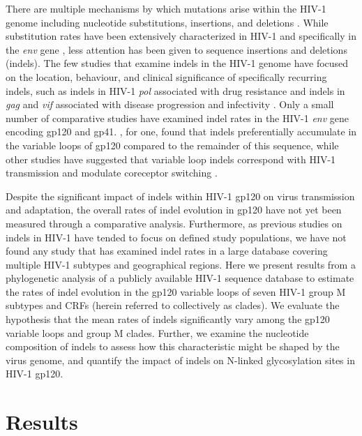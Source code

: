 \documentclass[12pt]{article}
\begin{document}
There are multiple mechanisms by which mutations arise within the HIV-1 genome including nucleotide substitutions, insertions, and deletions \citep{Abram:2010}.
While substitution rates have been extensively characterized in HIV-1 and specifically in the \textit{env} gene \citep{Keulen:1996, Nielsen:1998}, less attention has been given to sequence insertions and deletions (indels).  
The few studies that examine indels in the HIV-1 genome have focused on the location, behaviour, and clinical significance of specifically recurring indels, such as indels in HIV-1 \textit{pol} associated with drug resistance and indels in \textit{gag} and \textit{vif} associated with disease progression and infectivity \citep{Rakik:1999, Aralaguppe:2017, Alexander:2002}. 
Only a small number of comparative studies have examined indel rates in the HIV-1 \textit{env} gene encoding gp120 and gp41.
\citet{wood2009hiv}, for one, found that indels preferentially accumulate in the variable loops of gp120 compared to the remainder of this sequence, while other studies have suggested that variable loop indels correspond with HIV-1 transmission and modulate coreceptor switching \citep{Derdeyn:2004, Tsuchiya:2013}. 

Despite the significant impact of indels within HIV-1 gp120 on virus transmission and adaptation, the overall rates of indel evolution in gp120 have not yet been measured through a comparative analysis.
Furthermore, as previous studies on indels in HIV-1 have tended to focus on defined study populations, we have not found any study that has examined indel rates in a large database covering multiple HIV-1 subtypes and geographical regions.
Here we present results from a phylogenetic analysis of a publicly available HIV-1 sequence database to estimate the rates of indel evolution in the gp120 variable loops of seven HIV-1 group M subtypes and CRFs (herein referred to collectively as clades).
We evaluate the hypothesis that the mean rates of indels significantly vary among the gp120 variable loops and group M clades.
Further, we examine the nucleotide composition of indels to assess how this characteristic might be shaped by the virus genome, and quantify the impact of indels on N-linked glycosylation sites in HIV-1 gp120.


\section * {Results}
\end{document}
